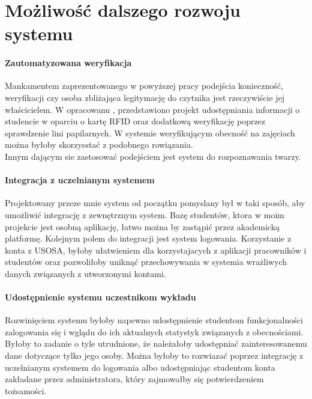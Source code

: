 \documentclass[declaration,shortabstract, mgr]{iithesis}
\begin{document}
\chapter{Możliwość dalszego rozwoju systemu}
\subsubsection{Zautomatyzowana weryfikacja}
\indent Mankamentem zaprezentowanego w powyższej pracy podejścia konieczność, weryfikacji czy osoba zbliżająca legitymację do czytnika jest rzeczywiście jej właścicielem. W opracowanu \cite{fingerprint}, przedstawiono projekt udostępniania informacji o studencie w oparciu o kartę RFID oraz dodatkową weryfikację poprzez sprawdzenie lini papilarnych. W systemie weryfikującym obecność na zajęciach można byłoby skorzysstać z podobnego rowiązania.\\
\indent Innym dającym sie zastosować podejściem jest system do rozpoznawania twarzy.
\subsubsection{Integracja z uczelnianym systemem}
\indent Projektowany przeze mnie system od początku pomyslany był w taki sposób, aby umożliwić integrację z zewnętrznym system. Bazę studentów, ktora w moim projekcie jest osobną aplikację, łatwo można by zastąpić przez akademicką platformę. Kolejnym polem do integracji jest system logowania. Korzystanie z konta z USOSA, byłoby ułatwieniem dla korzystajacych z aplikacji pracowników i studentów oraz pozwoliłoby uniknąć przechowywania w systemia wrażliwych danych związanych z utworzonymi kontami.
\subsubsection{Udostępnienie systemu uczestnikom wykładu}
\indent Rozwinięciem systemu byłoby napewno udostępnienie studentom funkcjonalności zalogowania się i wglądu do ich aktualnych statystyk związanych z obecnościami. Byłoby to zadanie o tyle utrudnione, że należałoby udostępniać zainteresowanemu dane dotyczące tylko jego osoby. Można byłoby to rozwiazać poprzez integrację z uczelnianym systemem do logowania albo udostępniając studentom konta zakładane przez administratora, który zajmowałby się potwierdzeniem tożsamości.
\end{document}
